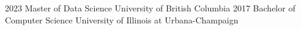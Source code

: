 \documentclass[localFont,alternative]{resume_template}
\begin{document}
    \begin{experiences}
    \degree
    {2023}
    {Master of Data Science}
    {University of British Columbia}
    \vspace{6pt}
    \degree
    {2017}
    {Bachelor of Computer Science}
    {University of Illinois at Urbana-Champaign}
    \end{experiences}
	
\end{document}
